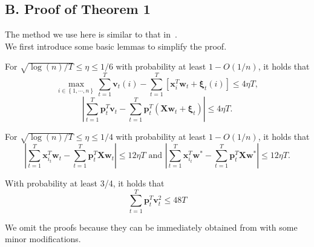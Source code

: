 \documentclass{llncs}
\newcommand{\bw}{\mathbf{w}}
\newcommand{\bp}{\mathbf{p}}
\newcommand{\bxi}{\mathbf{\xi}}
\newcommand{\sumt}{\sum_{t=1}^{T} }
\newcommand{\lc}{\left(}
\newcommand{\rc}{\right)}
\begin{document}
\subsection*{B. Proof of Theorem 1 }
The method we use here is similar to that in~\cite{hazanbeating}. \\
We first introduce some basic lemmas to simplify the proof.
	\begin{lemma} \label{lem:3}
	For $\sqrt{\log(n)/T} \leq \eta \leq 1/6$ with probability at least $1-O(1/n)$, it holds that
	\[	
	\max_{i\in\left\{1,\cdots,n\right\}} \sumt \mathbf{v}_t(i)-\sumt\left[ \mathbf{x}_i^T\bw_t+\bxi_t(i)\right] \leq 4 \eta T,
	\]
	\[	
	\left| \sumt \bp_t^T\mathbf{v}_t-\sumt\bp_t^T \lc \mathbf{X}\bw_t+\bxi_t \rc \right|\leq 4 \eta T.
	\]
	\end{lemma}
	\begin{lemma} \label{lem:5}
	For $ \sqrt{\log(n)/T} \leq \eta \leq 1/4 $ with probability at least $1-O(1/n)$, it holds that	
\[	
 \left| \sumt \mathbf{x}_{i_t}^T\bw_t-\sumt\bp_t^T \mathbf{X}\bw_t\right|\leq 12\eta T \mbox{ and }
	\left| \sumt \mathbf{x}_{i_t}^T\bw^*-\sumt\bp_t^T \mathbf{X}\bw^*\right|\leq 12\eta T.
\]
	\end{lemma}
	\begin{lemma} \label{lem:6}
	With probability at least 3/4, it holds that
	\[	
	\sumt \bp_t^T \mathbf{v}_t^2 \leq 48T
	\]
	\end{lemma}
We omit the proofs because they can be immediately obtained from \cite{hazanbeating} with some minor modifications.
\end{document}
